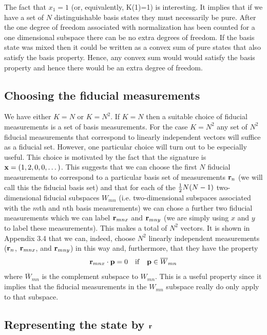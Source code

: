 \documentclass[10pt,twocolumn]{article}
\begin{document}
The fact that $x_1=1$ (or, equivalently, K(1)=1) is interesting.  It
implies that if we have a
set of $N$ distinguishable basis states they must necessarily be pure.
After the one degree of freedom associated with normalization has been
counted for a one
dimensional subspace there can be no extra degrees of freedom. If the
basis state was mixed then it could be written as a convex sum of pure
states that also satisfy the basis property. Hence, any convex sum would
would satisfy the basis property and hence there would be an extra
degree of freedom.

\subsection{Choosing the fiducial measurements}\label{choosing}

We have either $K=N$ or $K=N^2$. If $K=N$ then a suitable choice of
fiducial measurements is a set of basis measurements. For the case
$K=N^2$ any set of $N^2$ fiducial measurements that correspond to linearly
independent vectors will suffice as a fiducial set.  However, one
particular choice will turn out to be especially useful.  This choice
is motivated by the fact that the signature is
${\bf x}=(1,2,0,0,\dots)$.
This suggests that we can choose the first $N$ fiducial measurements to
correspond to a particular basis set of measurements ${\bf r}_n$ (we
will call this the fiducial basis set) and that for
each of the ${1\over2}N(N-1)$ two-dimensional fiducial subspaces
$W_{mn}$ (i.e.
two-dimensional subspaces associated with the $m$th and $n$th basis
measurements) we can chose a further two fiducial measurements which we can
label ${\bf r}_{mnx}$ and ${\bf r}_{mny}$ (we are simply using $x$ and
$y$ to label these measurements). This makes a total of $N^2$ vectors.
It is shown in Appendix 3.4 that we can, indeed, choose $N^2$ linearly
independent measurements
(${\bf r}_n$, ${\bf r}_{mnx}$, and ${\bf r}_{mny}$)
in this way and, furthermore, that they have the property
\begin{equation}\label{nooverlap}
{\bf r}_{mnx} \cdot {\bf p} = 0 ~~~{\rm if}~~~ {\bf p}\in \overline{W}_{mn}
\end{equation}
where $\overline{W}_{mn}$ is the complement subspace to $W_{mn}$.
This is a useful property since it implies that the fiducial measurements
in the $W_{mn}$ subspace really do only apply to that subspace.




\subsection{Representing the state by ${\bf r}$}
\end{document}
